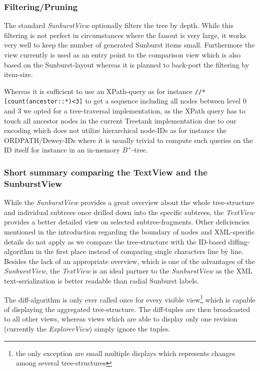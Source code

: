 \begin{itemize}
\subsubsection{Filtering/Pruning}
The standard \emph{SunburstView} optionally filters the tree by depth. While this filtering is not perfect in circumstances where the fanout is very large, it works very well to keep the number of generated Sunburst items small. Furthermore the view currently is used as an entry point to the comparison view which is also based on the Sunburst-layout whereas it is planned to back-port the filtering by item-size.

Whereas it is sufficient to use an XPath-query as for instance \texttt{//*[count(ancestor::*)<3]} to get a sequence including all nodes between level 0 and 3 we opted for a tree-traversal implementation, as the XPath query has to touch all ancestor nodes in the current Treetank implementation due to our encoding which does not utilize hierarchical node-IDs as for instance the ORDPATH/Dewey-IDs where it is usually trivial to compute such queries on the ID itself for instance in an in-memory $B^{+}$-tree.
\end{itemize}

\subsubsection{Short summary comparing the TextView and the SunburstView}
While the \emph{SunburstView} provides a great overview about the whole tree-structure and individual subtrees once drilled down into the specific subtrees, the \emph{TextView} provides a better detailed view on selected subtree-fragments. Other deficiencies mentioned in the introduction regarding the boundary of nodes and XML-specific details do not apply as we compare the tree-structure with the ID-based diffing-algorithm in the first place instead of comparing single characters line by line. Besides the lack of an appropriate overview, which is one of the advantages of the \emph{SunburstView}, the \emph{TextView} is an ideal partner to the \emph{SunburstView} as the XML text-serialization is better readable than radial Sunburst labels.

The diff-algorithm is only ever called once for every visible view\footnote{the only exception are small multiple displays which represents changes among several tree-structures} which is capable of displaying the aggregated tree-structure. The diff-tuples are then broadcasted to all other views, whereas views which are able to display only one revision (currently the \emph{ExplorerView}) simply ignore the tuples.

